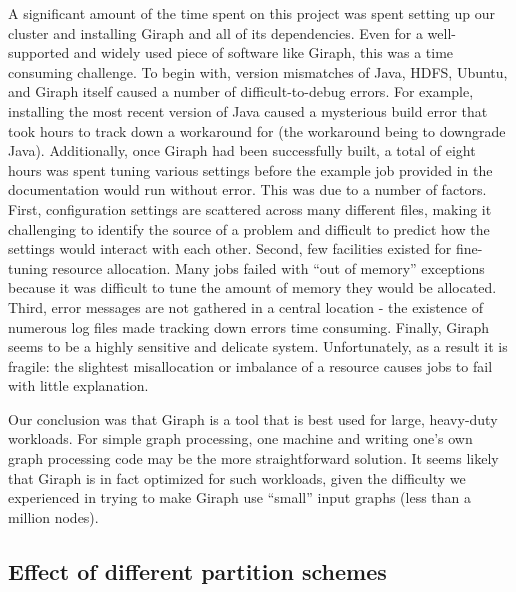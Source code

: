 A significant amount of the time spent on this project was spent setting up our 
cluster and installing Giraph and all of its dependencies. Even for a 
well-supported and widely used piece of software like Giraph, this was a time 
consuming challenge. To begin with, version mismatches of Java, HDFS, Ubuntu, 
and Giraph itself caused a number of difficult-to-debug errors. For example, 
installing the most recent version of Java caused a mysterious build error that 
took hours to track down a workaround for (the workaround being to downgrade 
Java). Additionally, once Giraph had been successfully built, a total of eight 
hours was spent tuning various settings before the example job provided in the 
documentation would run without error. This was due to a number of factors. 
First, configuration settings are scattered across many different files, making 
it challenging to identify the source of a problem and difficult to predict how 
the settings would interact with each other. Second, few facilities existed for 
fine-tuning resource allocation. Many jobs failed with ``out of memory'' 
exceptions because it was difficult to tune the amount of memory they would be 
allocated. Third, error messages are not gathered in a central location - the 
existence of numerous log files made tracking down errors time consuming. 
Finally, Giraph seems to be a highly sensitive and delicate system. 
Unfortunately, as a result it is fragile: the slightest misallocation or 
imbalance of a resource causes jobs to fail with little explanation.

Our conclusion was that Giraph is a tool that is best used for large, 
heavy-duty workloads. For simple graph processing, one machine and writing 
one's own graph processing code may be the more straightforward solution. It 
seems likely that Giraph is in fact optimized for such workloads, given the 
difficulty we experienced in trying to make Giraph use ``small'' input graphs 
(less than a million 
nodes).

\subsection{Effect of different partition schemes}